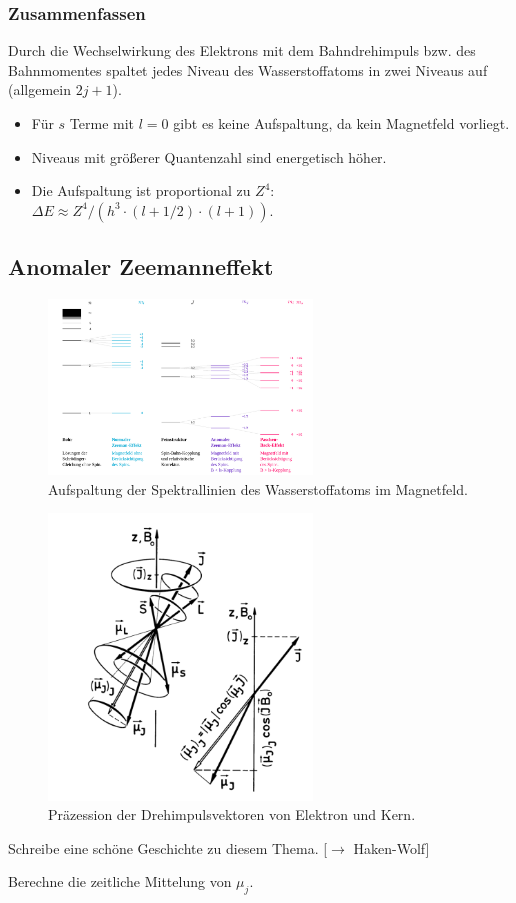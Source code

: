 \documentclass{subfiles}
\begin{document}
    \subsubsection*{Zusammenfassen}
        Durch die Wechselwirkung des Elektrons mit dem Bahndrehimpuls bzw. des Bahnmomentes spaltet jedes Niveau des Wasserstoffatoms in zwei Niveaus auf (allgemein $2j + 1$). 
        \begin{itemize}[label=$\to$]
            \item Für $s$ Terme mit $l = 0$ gibt es keine Aufspaltung, da kein Magnetfeld vorliegt. 
            \item Niveaus mit größerer Quantenzahl sind energetisch höher.
            \item Die Aufspaltung ist proportional zu $Z^4$: $\Delta E \approx Z^4/(h^3\cdot (l+1/2)\cdot (l + 1))$. 
        \end{itemize}

    \subsection{Anomaler Zeemanneffekt}

        \begin{figure}
            \centering
            \includegraphics[width=7cm]{Bilddateien/Wasserstoff_Zeeman.svg.png}
            \caption{Aufspaltung der Spektrallinien des Wasserstoffatoms im Magnetfeld.}
        \end{figure}

        \begin{figure}
            \centering
            \includegraphics[width=7cm]{Bilddateien/Praezession.png}
            \caption{Präzession der Drehimpulsvektoren von Elektron und Kern.}
        \end{figure}
        \begin{Aufgabe}
            \nr{} Schreibe eine schöne Geschichte zu diesem Thema. [$\to$ Haken-Wolf]

            \nr{} Berechne die zeitliche Mittelung von $\mu_j$. 
        \end{Aufgabe}
\end{document}
